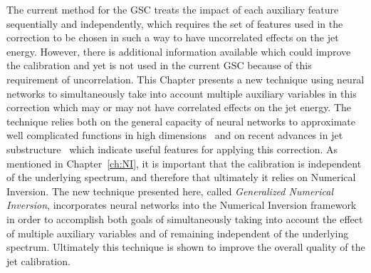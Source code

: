 The current method for the GSC treats the impact of each auxiliary feature sequentially and independently, which requires the set of features used in the correction to be chosen in such a way to have uncorrelated effects on the jet energy.
However, there is additional information available which could improve the calibration and yet is not used in the current GSC because of this requirement of uncorrelation.
This Chapter presents a new technique using neural networks to simultaneously take into account multiple auxiliary variables in this correction which may or may not have correlated effects on the jet energy.
The technique relies both on the general capacity of neural networks to approximate well complicated functions in high dimensions~\cite{HORNIK1991251} and on recent advances in jet substructure~\cite{Larkoski:2017jix} which indicate useful features for applying this correction.
As mentioned in Chapter~\ref{ch:NI}, it is important that the calibration is independent of the underlying spectrum, and therefore that ultimately it relies on Numerical Inversion.
The new technique presented here, called \textit{Generalized Numerical Inversion}, incorporates neural networks into the Numerical Inversion framework in order to accomplish both goals of simultaneously taking into account the effect of multiple auxiliary variables and of remaining independent of the underlying spectrum.
Ultimately this technique is shown to improve the overall quality of the jet calibration.

